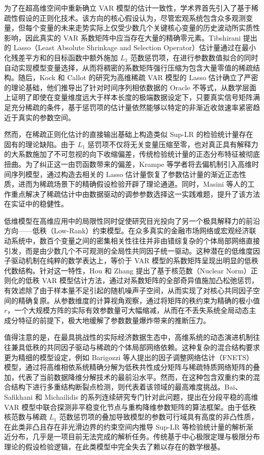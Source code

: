 为了在超高维空间中重新确立 VAR 模型的估计一致性，学术界首先引入了基于稀疏性假设的正则化技术。该方向的核心假设认为，尽管宏观系统包含众多观测变量，但每个变量的未来走势实际上仅受少数几个关键核心变量的历史波动所实质性影响，因此真实的 VAR 系数矩阵中应当存在大量的精确零元素。Tibshirani 提出的 Lasso（Least Absolute Shrinkage and Selection Operator）估计量通过在最小化残差平方和的目标函数中额外施加 $L_1$ 范数惩罚项，在进行参数数值拟合的同时自动实现模型变量选择，从而将稠密的系数矩阵强行压缩为包含大量零值的稀疏结构。随后，Kock 和 Callot 的研究为高维稀疏 VAR 模型的 Lasso 估计确立了严密的理论基础，他们推导出了针对时间序列相依数据的 Oracle 不等式，从数学层面上证明了即使在变量维度远大于样本长度的极端数据设定下，只要真实信号矩阵满足充分稀疏的条件，基于惩罚项的估计量依然能够以特定的非渐近收敛速率紧密趋近于真实的参数空间。

然而，在稀疏正则化估计的直接输出基础上构造类似 Sup-LR 的检验统计量存在固有的理论缺陷。由于 $L_1$ 惩罚项不仅将无关变量压缩至零，也对真正具有解释力的大系数施加了不可忽视的向下收缩偏差，传统检验统计量的正态分布特征被彻底扭曲。为了纠正这一由罚函数带来的偏差，Krampe 等学者将去偏机制引入高维时间序列模型，通过构造去相关的 Lasso 估计量恢复了参数估计量的渐近正态性质，进而为稀疏场景下的精确假设检验开辟了理论通道。同时，Masini 等人的工作重点解决了稀疏估计中由数据驱动的调参参数选择这一实践难题，提升了该方法在实证中的稳健性。

低维模型在高维应用中的局限性同时促使研究目光投向了另一个极具解释力的前沿方向——低秩（Low-Rank）约束模型。在众多真实的金融市场网络或宏观经济联动系统中，数百个变量之间的密集相关性往往并非由错综复杂的个体局部网络直接引发，而是由少数几个不可观测的全局性共同因子统一驱动。这种潜在的低维度因子驱动机制在纯粹的数学表达上，等价于 VAR 模型的系数矩阵呈现出明显的低秩代数结构。针对这一特性，Hou 和 Zhang 提出了基于核范数（Nuclear Norm）正则化的低秩 VAR 模型估计方法，通过对系数矩阵的全部奇异值施加凸松弛惩罚，有效滤除了由于样本量不足引起的随机噪声子空间，从而实现了对核心共同因子空间的精确复原。从参数维度的计算视角观察，通过将矩阵的秩约束为精确的极小值 $r$，一个大规模方阵的实际有效参数量可大幅缩减，从而在不丢失系统全局动态主成分特征的前提下，极大地缓解了参数数量爆炸带来的推断压力。

值得注意的是，在最具挑战性的实际经济数据生态中，高维系统的动态演进机制往往兼具低秩的共同因子驱动与稀疏的个体局部网络依赖。这种复杂的混合结构要求更为精细的模型设定，例如 Barigozzi 等人提出的因子调整网络估计（FNETS）模型，通过将高维相依系统精确分解为低秩共性成分矩阵与稀疏特质网络矩阵的叠加，代表了当前数据降维分解技术的最前沿水平。然而，在这种包含双重约束的混合结构下进行多重结构断裂点检测，则代表着该领域的最高难度挑战。Bai、Safikhani 和 Michailidis 的系列连续研究专门针对此问题，提出在分段平稳的高维 VAR 模型中联合探测非平稳变化节点与重构降维参数矩阵的算法框架。由于低秩核范数与稀疏 $L_1$ 范数惩罚项的叠加导致模型的参数可行域具有高度的非凸性质，在此类非凸且存在非光滑边界的约束空间内推导 Sup-LR 等检验统计量的解析渐近分布，几乎是一项目前无法完成的解析任务。传统基于中心极限定理与极限分布理论的假设检验逻辑，在此类模型中完全失去了赖以存在的数学根基。

